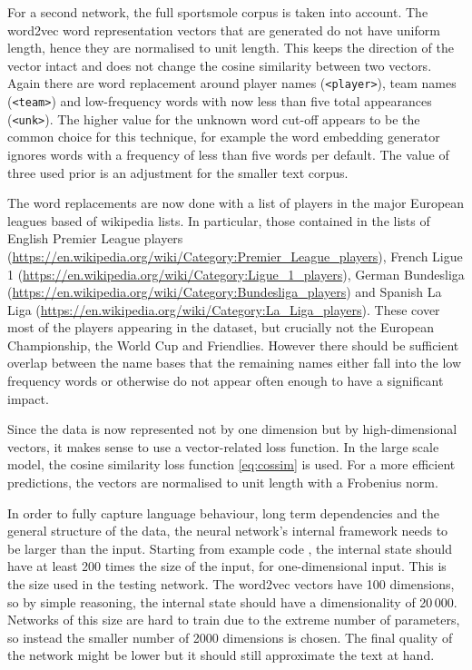 \documentclass[10pt, a4paper]{UUThesisTemplate}
\begin{document}
For a second network, the full sportsmole corpus is taken into account. The word2vec word representation vectors that are generated do not have uniform length, hence they are normalised to unit length. This keeps the direction of the vector intact and does not change the cosine similarity between two vectors. Again there are word replacement around player names (\texttt{<player>}), team names (\texttt{<team>}) and low-frequency words with now less than five total appearances (\texttt{<unk>}). The higher value for the unknown word cut-off appears to be the common choice for this technique, for example the word embedding generator ignores words with a frequency of less than five words per default. The value of three used prior is an adjustment for the smaller text corpus.

The word replacements are now done with a list of players in the major European leagues based of wikipedia lists. In particular, those contained in the lists of English Premier League players (\url{https://en.wikipedia.org/wiki/Category:Premier_League_players}), French Ligue 1 (\url{https://en.wikipedia.org/wiki/Category:Ligue_1_players}), German Bundesliga (\url{https://en.wikipedia.org/wiki/Category:Bundesliga_players}) and Spanish La Liga (\url{https://en.wikipedia.org/wiki/Category:La_Liga_players}). These cover most of the players appearing in the dataset, but crucially not the European Championship, the World Cup and Friendlies. However there should be sufficient overlap between the name bases that the remaining names either fall into the low frequency words or otherwise do not appear often enough to have a significant impact.

Since the data is now represented not by one dimension but by high-dimensional vectors, it makes sense to use a vector-related loss function. In the large scale model, the cosine similarity loss function \eqref{eq:cossim} is used. For a more efficient predictions, the vectors are normalised to unit length with a Frobenius norm. 

In order to fully capture language behaviour, long term dependencies and the general structure of the data, the neural network's internal framework needs to be larger than the input. Starting from example code \cite{tensorflowrnn}, the internal state should have at least 200 times the size of the input, for one-dimensional input. This is the size used in the testing network. The word2vec vectors have 100 dimensions, so by simple reasoning, the internal state should have a dimensionality of 20\,000. Networks of this size are hard to train due to the extreme number of parameters, so instead the smaller number of 2000 dimensions is chosen. The final quality of the network might be lower but it should still approximate the text at hand.
\end{document}
